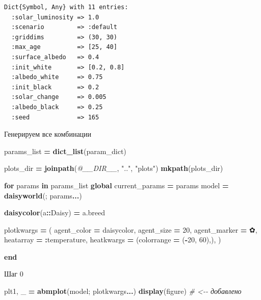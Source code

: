 \documentclass[
  english,
  russian,
  12pt,
  a4paper,
  DIV=11,
  numbers=noendperiod]{scrreprt}
\newenvironment{Shaded}{\begin{snugshade}}{\end{snugshade}}
\newcommand{\CharTok}[1]{\textcolor[rgb]{0.31,0.60,0.02}{#1}}
\newcommand{\CommentTok}[1]{\textcolor[rgb]{0.56,0.35,0.01}{\textit{#1}}}
\newcommand{\ControlFlowTok}[1]{\textcolor[rgb]{0.13,0.29,0.53}{\textbf{#1}}}
\newcommand{\DataTypeTok}[1]{\textcolor[rgb]{0.13,0.29,0.53}{#1}}
\newcommand{\FloatTok}[1]{\textcolor[rgb]{0.00,0.00,0.81}{#1}}
\newcommand{\FunctionTok}[1]{\textcolor[rgb]{0.13,0.29,0.53}{\textbf{#1}}}
\newcommand{\KeywordTok}[1]{\textcolor[rgb]{0.13,0.29,0.53}{\textbf{#1}}}
\newcommand{\NormalTok}[1]{#1}
\newcommand{\OperatorTok}[1]{\textcolor[rgb]{0.81,0.36,0.00}{\textbf{#1}}}
\newcommand{\PreprocessorTok}[1]{\textcolor[rgb]{0.56,0.35,0.01}{\textit{#1}}}
\newcommand{\StringTok}[1]{\textcolor[rgb]{0.31,0.60,0.02}{#1}}
\begin{document}
\begin{verbatim}
Dict{Symbol, Any} with 11 entries:
  :solar_luminosity => 1.0
  :scenario         => :default
  :griddims         => (30, 30)
  :max_age          => [25, 40]
  :surface_albedo   => 0.4
  :init_white       => [0.2, 0.8]
  :albedo_white     => 0.75
  :init_black       => 0.2
  :solar_change     => 0.005
  :albedo_black     => 0.25
  :seed             => 165
\end{verbatim}

Генерируем все комбинации

\begin{Shaded}
\begin{Highlighting}[]
\NormalTok{params\_list }\OperatorTok{=} \FunctionTok{dict\_list}\NormalTok{(param\_dict)}

\NormalTok{plots\_dir }\OperatorTok{=} \FunctionTok{joinpath}\NormalTok{(}\PreprocessorTok{@\_\_DIR\_\_}\NormalTok{, }\StringTok{".."}\NormalTok{, }\StringTok{"plots"}\NormalTok{)}
\FunctionTok{mkpath}\NormalTok{(plots\_dir)}

\ControlFlowTok{for}\NormalTok{ params }\KeywordTok{in}\NormalTok{ params\_list}
    \KeywordTok{global}\NormalTok{ current\_params }\OperatorTok{=}\NormalTok{ params}
\NormalTok{    model }\OperatorTok{=} \FunctionTok{daisyworld}\NormalTok{(; params}\OperatorTok{...}\NormalTok{)}

    \FunctionTok{daisycolor}\NormalTok{(a}\OperatorTok{::}\DataTypeTok{Daisy}\NormalTok{) }\OperatorTok{=}\NormalTok{ a.breed}

\NormalTok{    plotkwargs }\OperatorTok{=}\NormalTok{ (}
\NormalTok{        agent\_color }\OperatorTok{=}\NormalTok{ daisycolor,}
\NormalTok{        agent\_size }\OperatorTok{=} \FloatTok{20}\NormalTok{,}
\NormalTok{        agent\_marker }\OperatorTok{=} \CharTok{\textquotesingle{}✿\textquotesingle{}}\NormalTok{,}
\NormalTok{        heatarray }\OperatorTok{=} \OperatorTok{:}\NormalTok{temperature,}
\NormalTok{        heatkwargs }\OperatorTok{=}\NormalTok{ (colorrange }\OperatorTok{=}\NormalTok{ (}\OperatorTok{{-}}\FloatTok{20}\NormalTok{, }\FloatTok{60}\NormalTok{),),}
\NormalTok{    )}
    
\ControlFlowTok{end}
\end{Highlighting}
\end{Shaded}

Шаг 0

\begin{Shaded}
\begin{Highlighting}[]
\NormalTok{    plt1, \_ }\OperatorTok{=} \FunctionTok{abmplot}\NormalTok{(model; plotkwargs}\OperatorTok{...}\NormalTok{)}
    \FunctionTok{display}\NormalTok{(figure)  }\CommentTok{\# \textless{}{-}{-} добавлено}
\end{Highlighting}
\end{Shaded}
\end{document}
